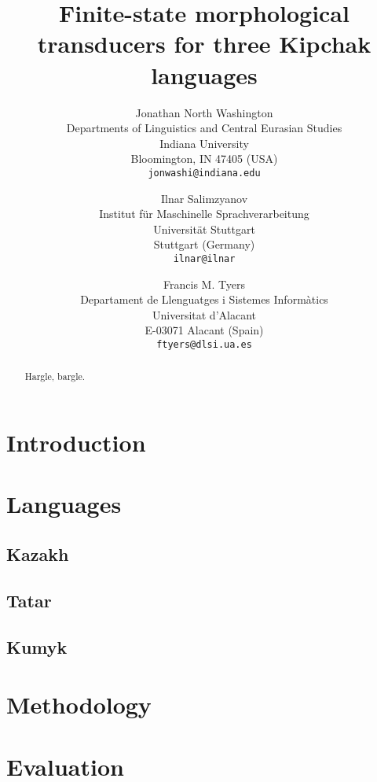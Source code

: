 \documentclass{article}
\title{Finite-state morphological transducers for three Kipchak languages}
\author{Jonathan North Washington \\
Departments of Linguistics and Central Eurasian Studies\\
Indiana University\\
Bloomington, IN 47405 (USA)\\
\texttt{jonwashi@indiana.edu} \and
Ilnar Salimzyanov  \\
Institut für Maschinelle Sprachverarbeitung \\
Universität Stuttgart\\
Stuttgart (Germany) \\
\texttt{ilnar@ilnar} \and 
Francis M. Tyers\\
Departament de Llenguatges i Sistemes Informàtics \\  
Universitat d'Alacant\\
E-03071 Alacant (Spain)\\
\texttt{ftyers@dlsi.ua.es} 
}
\begin{document}
\maketitle

\begin{abstract}
Hargle, bargle.
\end{abstract}

\section{Introduction}

\cite{washington2012}
\cite{salimzyanov2013}
\cite{bekmanova2013}

\section{Languages}

\subsection{Kazakh}

\subsection{Tatar}

\subsection{Kumyk}

\cite{bammatov1960}

\section{Methodology}

\section{Evaluation}
\end{document}
